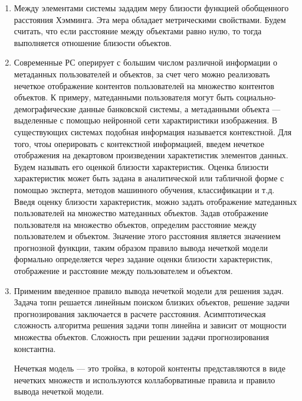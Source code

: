 \documentclass[a4paper,11pt]{proc}
\begin{document}
{\begin{enumerate}
	\item Между элементами системы зададим меру близости функцией
		обобщенного расстояния Хэмминга. Эта мера обладает
		метрическими свойствами. Будем считать, что если расстояние между
		объектами равно нулю, то тогда выполняется отношение близости объектов.

	\item Современные РС оперирует с большим числом различной информации о
		метаданных пользователей и объектов, за счет чего можно реализовать нечеткое
		отображение контентов пользователей на
		множество контентов объектов. К примеру, матеданными пользователя могут быть
		социально-демографические данные банковской системы, а метаданными объекта ---
		выделенные с помощью нейронной сети характиристики изображения. В существующих
		системах подобная информация называется контекстной.
		Для того, чтоы оперировать с контекстной информацией,
		введем нечеткое отображения на декартовом произведении
		характетистик элементов данных. Будем называть его оценкой близости
		характеристик. Оценка близости характеристик может быть задана в
		аналитической или табличной форме с
		помощью эксперта, методов машинного обучения, классификации и т.д. Введя
		оценку близости характеристик,
		можно задать отображение матеданных пользователей на множество матеданных
		объектов. Задав отображение пользователя на множество объектов, определим
		расстояние между пользователем и объектом. Значение этого расстояния
		является значением прогнозной функции, таким образом правило вывода
		нечеткой модели формально определяется через задание оценки близости
		характеристик, отображение и расстояние между пользователем и объектом.

	\item Применим введенное правило вывода нечеткой модели для решения задач.
		Задача топн решается линейным поиском близких объектов, решение задачи
		прогнозирования заключается в расчете расстояния. Асимптотическая
		сложность алгоритма решения задачи топн линейна и зависит от мощности
		множества объектов. Сложность при решении задачи прогнозирования
		константна.

		Нечеткая модель --- это тройка, в которой контенты представляются в
		виде нечетких множеств и используются коллаборватиные правила и правило
		вывода нечеткой модели.


\end{enumerate}}
\end{document}
